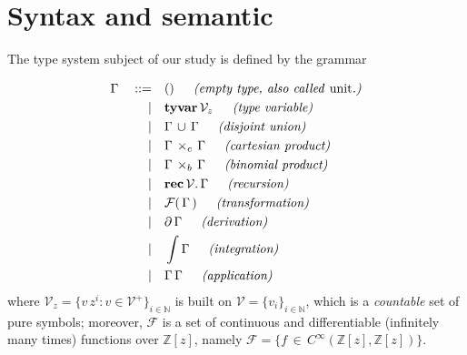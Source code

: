\section{Syntax and semantic}

The type system subject of our study is defined by the grammar
\begin{definition}[Syntax]
\begin{displaymath}
\begin{split}
\Gamma\quad::=\quad&()\indent\textit{(empty type, also called \emph{unit}.)} \\
             |\quad&\textbf{tyvar}\,\mathcal{V}_{z}\indent\textit{(type variable)} \\
             |\quad&\Gamma\,\cup\,\Gamma\indent\textit{(disjoint union)} \\
             |\quad&\Gamma\,\times_{c}\,\Gamma\indent\textit{(cartesian product)} \\
             |\quad&\Gamma\,\times_{b}\,\Gamma\indent\textit{(binomial product)} \\
             |\quad&\textbf{rec}\,\mathcal{V}.\,\Gamma\indent\textit{(recursion)} \\
             |\quad&\mathcal{F}(\,\Gamma\,)\indent\textit{(transformation)} \\
             |\quad&\partial\,{\Gamma}\indent\textit{(derivation)} \\
             |\quad&\int{\Gamma}\indent\textit{(integration)} \\
             |\quad&\Gamma\,\Gamma\indent\textit{(application)} \\
\end{split}
\end{displaymath}
where $\mathcal{V}_{z} = \lbrace v\,z^{i}:v\in\mathcal{V}^{+}
\rbrace_{i\in\mathbb{N}}$ is built on $\mathcal{V}=  \lbrace v_{i}
\rbrace_{i\in\mathbb{N}}$, which is a \textit{countable} set of pure symbols;
moreover, $\mathcal{F}$ is a set of continuous and differentiable (infinitely
many times) functions over $\mathbb{Z}[z]$, namely  $\mathcal{F} = \lbrace
f\,\in\,C^{\infty}(\mathbb{Z}[z], \mathbb{Z}[z])\rbrace$.
\end{definition}

